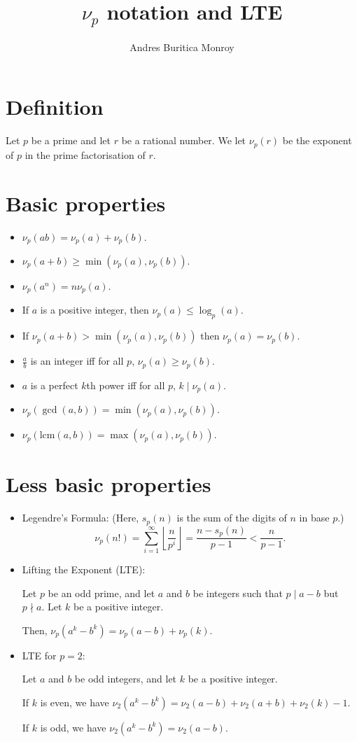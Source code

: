 \documentclass{article}
\title{$\nu_p$ notation and LTE}
\author{Andres Buritica Monroy}
\date{}
\newcommand\lcm{\mathrm{lcm}}
\begin{document}
\maketitle
\section{Definition}
Let $p$ be a prime and let $r$ be a rational number. We let $\nu_p(r)$ be the
exponent of $p$ in the prime factorisation of $r$.
\section{Basic properties}
\begin{itemize}
	\item $\nu_p(ab)=\nu_p(a)+\nu_p(b)$.
	\item $\nu_p(a+b)\ge\min(\nu_p(a),\nu_p(b))$.
	\item $\nu_p(a^n)=n\nu_p(a)$.
	\item If $a$ is a positive integer, then $\nu_p(a)\le\log_p(a)$.
	\item If $\nu_p(a+b)>\min(\nu_p(a),\nu_p(b))$ then $\nu_p(a)=\nu_p(b)$.
	\item $\frac ab$ is an integer iff for all $p$, $\nu_p(a)\ge\nu_p(b)$.
	\item $a$ is a perfect $k$th power iff for all $p$, $k\mid\nu_p(a)$.
	\item $\nu_p(\gcd(a,b))=\min(\nu_p(a),\nu_p(b))$.
	\item $\nu_p(\lcm(a,b))=\max(\nu_p(a),\nu_p(b))$.
\end{itemize}
\section{Less basic properties}
\begin{itemize}
	\item Legendre's Formula: (Here, $s_p(n)$ is the sum of the digits of $n$ in
	      base $p$.)
	      \[\nu_p(n!)=\sum_{i=1}^\infty\left\lfloor\frac
		      n{p^i}\right\rfloor=\frac{n-s_p(n)}{p-1}<\frac
		      n{p-1}.\]
	\item Lifting the Exponent (LTE):

	      Let $p$ be an odd prime, and let $a$ and $b$ be integers such that $p\mid
		      a-b$ but $p\nmid a$. Let $k$ be a positive integer.

	      Then, $\nu_p\left(a^k-b^k\right)=\nu_p(a-b)+\nu_p(k)$.
	\item LTE for $p=2$:

	      Let $a$ and $b$ be odd integers, and let $k$ be a positive integer.

	      If $k$ is even, we have $\nu_2(a^k-b^k)=\nu_2(a-b)+\nu_2(a+b)+\nu_2(k)-1$.

	      If $k$ is odd, we have $\nu_2(a^k-b^k)=\nu_2(a-b)$.
\end{itemize}
\end{document}
